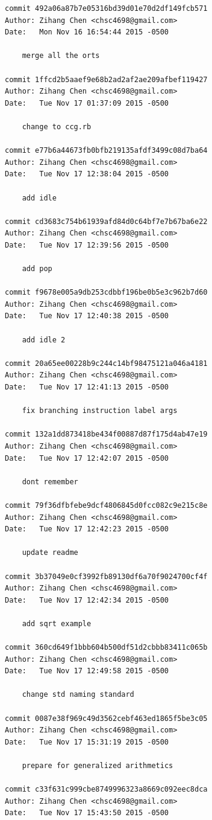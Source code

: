 \documentclass{report}
\begin{document}
\begin{appendices}
\begin{verbatim}
commit 492a06a87b7e05316bd39d01e70d2df149fcb571
Author: Zihang Chen <chsc4698@gmail.com>
Date:   Mon Nov 16 16:54:44 2015 -0500

    merge all the orts

commit 1ffcd2b5aaef9e68b2ad2af2ae209afbef119427
Author: Zihang Chen <chsc4698@gmail.com>
Date:   Tue Nov 17 01:37:09 2015 -0500

    change to ccg.rb

commit e77b6a44673fb0bfb219135afdf3499c08d7ba64
Author: Zihang Chen <chsc4698@gmail.com>
Date:   Tue Nov 17 12:38:04 2015 -0500

    add idle

commit cd3683c754b61939afd84d0c64bf7e7b67ba6e22
Author: Zihang Chen <chsc4698@gmail.com>
Date:   Tue Nov 17 12:39:56 2015 -0500

    add pop

commit f9678e005a9db253cdbbf196be0b5e3c962b7d60
Author: Zihang Chen <chsc4698@gmail.com>
Date:   Tue Nov 17 12:40:38 2015 -0500

    add idle 2

commit 20a65ee00228b9c244c14bf98475121a046a4181
Author: Zihang Chen <chsc4698@gmail.com>
Date:   Tue Nov 17 12:41:13 2015 -0500

    fix branching instruction label args

commit 132a1dd873418be434f00887d87f175d4ab47e19
Author: Zihang Chen <chsc4698@gmail.com>
Date:   Tue Nov 17 12:42:07 2015 -0500

    dont remember

commit 79f36dfbfebe9dcf4806845d0fcc082c9e215c8e
Author: Zihang Chen <chsc4698@gmail.com>
Date:   Tue Nov 17 12:42:23 2015 -0500

    update readme

commit 3b37049e0cf3992fb89130df6a70f9024700cf4f
Author: Zihang Chen <chsc4698@gmail.com>
Date:   Tue Nov 17 12:42:34 2015 -0500

    add sqrt example

commit 360cd649f1bbb604b500df51d2cbbb83411c065b
Author: Zihang Chen <chsc4698@gmail.com>
Date:   Tue Nov 17 12:49:58 2015 -0500

    change std naming standard

commit 0087e38f969c49d3562cebf463ed1865f5be3c05
Author: Zihang Chen <chsc4698@gmail.com>
Date:   Tue Nov 17 15:31:19 2015 -0500

    prepare for generalized arithmetics

commit c33f631c999cbe8749996323a8669c092eec8dca
Author: Zihang Chen <chsc4698@gmail.com>
Date:   Tue Nov 17 15:43:50 2015 -0500


\end{verbatim}
\end{appendices}
\end{document}
